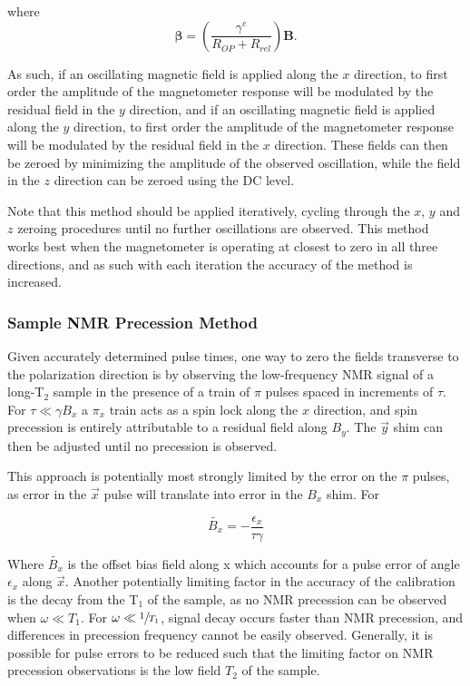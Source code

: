 \documentclass[PaulGanssle-Thesis.tex]{subfiles}
\begin{document}
where 
\begin{equation}
\label{oscillation.serf.definebeta}
\boldsymbol{\beta} = \left(\frac{\gamma^e}{R_{OP} + R_{rel}}\right)\mathbf{B}.
\end{equation}

As such, if an oscillating magnetic field is applied along the $x$ direction, to first order the amplitude of the magnetometer response will be modulated by the residual field in the $y$ direction, and if an oscillating magnetic field is applied along the $y$ direction, to first order the amplitude of the magnetometer response will be modulated by the residual field in the $x$ direction. These fields can then be zeroed by minimizing the amplitude of the observed oscillation, while the field in the $z$ direction can be zeroed using the DC level.

Note that this method should be applied iteratively, cycling through the $x$, $y$ and $z$ zeroing procedures until no further oscillations are observed. This method works best when the magnetometer is operating at closest to zero in all three directions, and as such with each iteration the accuracy of the method is increased.

\subsubsection{Sample NMR Precession Method}
\label{mag.design.shim.coils.zeroing.sample.nmr}
Given accurately determined pulse times, one way to zero the fields transverse to the polarization direction is by observing the low-frequency NMR signal of a long-T$_2$ sample in the presence of a train of $\pi$ pulses spaced in increments of $\tau$. For $\tau \ll \gamma B_x$ a $\pi_x$ train acts as a spin lock along the $x$ direction, and spin precession is entirely attributable to a residual field along $B_y$. The $\vec{y}$ shim can then be adjusted until no precession is observed. 

This approach is potentially most strongly limited by the error on the $\pi$ pulses, as error in the $\vec{x}$ pulse will translate into error in the $B_{x}$ shim. For

\begin{equation}
\tilde{B_{x}} = -\frac{\epsilon_{x}}{\tau\gamma}
\end{equation}

Where $\tilde{B_{x}}$ is the offset bias field along x which accounts for a pulse error of angle $\epsilon_{x}$ along $\vec{x}$. Another potentially limiting factor in the accuracy of the calibration is the decay from the T$_1$ of the sample, as no NMR precession can be observed when $\omega \ll T_{1}$. For $\omega \ll \sfrac{1}{T_{1}}$, signal decay occurs faster than NMR precession, and differences in precession frequency cannot be easily observed. Generally, it is possible for pulse errors to be reduced such that the limiting factor on NMR precession observations is the low field $T_2$ of the sample.
\end{document}
